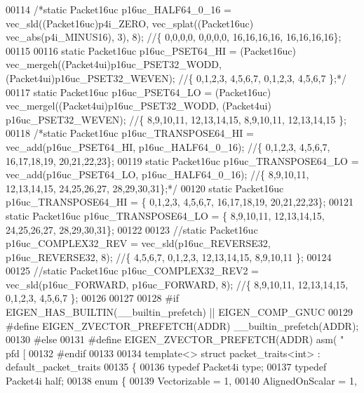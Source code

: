 \begin{DoxyCode}
00114 \textcolor{comment}{/*static Packet16uc p16uc\_HALF64\_0\_16 = vec\_sld((Packet16uc)p4i\_ZERO, vec\_splat((Packet16uc)
       vec\_abs(p4i\_MINUS16), 3), 8);      //\{ 0,0,0,0, 0,0,0,0, 16,16,16,16, 16,16,16,16\};}
00115 \textcolor{comment}{}
00116 \textcolor{comment}{static Packet16uc p16uc\_PSET64\_HI = (Packet16uc) vec\_mergeh((Packet4ui)p16uc\_PSET32\_WODD,
       (Packet4ui)p16uc\_PSET32\_WEVEN);     //\{ 0,1,2,3, 4,5,6,7, 0,1,2,3, 4,5,6,7 \};*/}
00117 \textcolor{keyword}{static} Packet16uc p16uc\_PSET64\_LO = (Packet16uc) vec\_mergel((Packet4ui)p16uc\_PSET32\_WODD, (Packet4ui)
      p16uc\_PSET32\_WEVEN);     \textcolor{comment}{//\{ 8,9,10,11, 12,13,14,15, 8,9,10,11, 12,13,14,15 \};}
00118 \textcolor{comment}{/*static Packet16uc p16uc\_TRANSPOSE64\_HI = vec\_add(p16uc\_PSET64\_HI, p16uc\_HALF64\_0\_16);                    
                           //\{ 0,1,2,3, 4,5,6,7, 16,17,18,19, 20,21,22,23\};}
00119 \textcolor{comment}{static Packet16uc p16uc\_TRANSPOSE64\_LO = vec\_add(p16uc\_PSET64\_LO, p16uc\_HALF64\_0\_16);                      
                         //\{ 8,9,10,11, 12,13,14,15, 24,25,26,27, 28,29,30,31\};*/}
00120 \textcolor{keyword}{static} Packet16uc p16uc\_TRANSPOSE64\_HI = \{ 0,1,2,3, 4,5,6,7, 16,17,18,19, 20,21,22,23\};
00121 \textcolor{keyword}{static} Packet16uc p16uc\_TRANSPOSE64\_LO = \{ 8,9,10,11, 12,13,14,15, 24,25,26,27, 28,29,30,31\};
00122 
00123 \textcolor{comment}{//static Packet16uc p16uc\_COMPLEX32\_REV = vec\_sld(p16uc\_REVERSE32, p16uc\_REVERSE32, 8);                    
                           //\{ 4,5,6,7, 0,1,2,3, 12,13,14,15, 8,9,10,11 \};}
00124 
00125 \textcolor{comment}{//static Packet16uc p16uc\_COMPLEX32\_REV2 = vec\_sld(p16uc\_FORWARD, p16uc\_FORWARD, 8);                       
                           //\{ 8,9,10,11, 12,13,14,15, 0,1,2,3, 4,5,6,7 \};}
00126 
00127 
00128 \textcolor{preprocessor}{#if EIGEN\_HAS\_BUILTIN(\_\_builtin\_prefetch) || EIGEN\_COMP\_GNUC}
00129 \textcolor{preprocessor}{  #define EIGEN\_ZVECTOR\_PREFETCH(ADDR) \_\_builtin\_prefetch(ADDR);}
00130 \textcolor{preprocessor}{#else}
00131 \textcolor{preprocessor}{  #define EIGEN\_ZVECTOR\_PREFETCH(ADDR) asm( "   pfd [%
00132 \textcolor{preprocessor}{#endif}
00133 
00134 \textcolor{keyword}{template}<> \textcolor{keyword}{struct }packet\_traits<int>    : default\_packet\_traits
00135 \{
00136   \textcolor{keyword}{typedef} Packet4i type;
00137   \textcolor{keyword}{typedef} Packet4i half;
00138   \textcolor{keyword}{enum} \{
00139     Vectorizable = 1,
00140     AlignedOnScalar = 1,
}
\end{DoxyCode}
